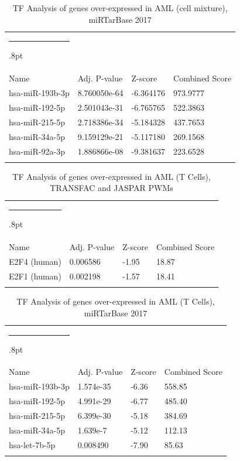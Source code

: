 \documentclass[3p,authoryear,preprint,12pt]{elsarticle}
\makeatletter
\def\hlinewd#1{%
  \noalign{\ifnum0=`}\fi\hrule \@height #1%
  \futurelet\reserved@a\@xhline}
\def\tbltoprule{\hlinewd{.8pt}\\[-12pt]}
\def\tblbottomrule{\noalign{\vspace*{6pt}}\hline\noalign{\vspace*{2pt}}}
\def\tblmidrule{\noalign{\vspace*{6pt}}\hline\noalign{\vspace*{2pt}}}
\makeatother
\begin{document}
\begin{table}[!htbp]
	\caption{{TF Analysis of genes over-expressed in AML (cell mixture), miRTarBase 2017} }
	\label{tw-de478ae31cg6}
	\def\arraystretch{1}
	\ignorespaces 
	\centering 
	\begin{tabulary}{\linewidth}{p{\dimexpr.65\tabcolsep}p{\dimexpr.15\tabcolsep}p{\dimexpr.1\tabcolsep}p{\dimexpr.1\tabcolsep}}
		\tbltoprule Name & Adj. P-value & Z-score & Combined Score\\
		\tblmidrule
hsa-miR-193b-3p & 8.760050e-64 & -6.364176 & 973.9777 \\
hsa-miR-192-5p & 2.501043e-31 & -6.765765 & 522.3863 \\
hsa-miR-215-5p & 2.718386e-34 & -5.184328 & 437.7653 \\
hsa-miR-34a-5p & 9.159129e-21 & -5.117180 & 269.1568 \\
hsa-miR-92a-3p & 1.886866e-08 & -9.381637 & 223.6528 \\
		\tblbottomrule
	\end{tabulary}\par 
\end{table}
\begin{table}[!htbp]
	\caption{{TF Analysis of genes over-expressed in AML (T Cells), TRANSFAC and JASPAR PWMs} }
	\label{tw-de478ae31ch6}
	\def\arraystretch{1}
	\ignorespaces 
	\centering 
	\begin{tabulary}{\linewidth}{p{\dimexpr.65\tabcolsep}p{\dimexpr.15\tabcolsep}p{\dimexpr.1\tabcolsep}p{\dimexpr.1\tabcolsep}}
		\tbltoprule Name & Adj. P-value & Z-score & Combined Score\\
		\tblmidrule
E2F4 (human) & 0.006586 & -1.95 & 18.87 \\
E2F1 (human) & 0.002198 & -1.57 & 18.41 \\
		\tblbottomrule
	\end{tabulary}\par 
\end{table}
\begin{table}[!htbp]
	\caption{{TF Analysis of genes over-expressed in AML (T Cells), miRTarBase 2017} }
	\label{tw-de478ae31ci6}
	\def\arraystretch{1}
	\ignorespaces 
	\centering 
	\begin{tabulary}{\linewidth}{p{\dimexpr.65\tabcolsep}p{\dimexpr.15\tabcolsep}p{\dimexpr.1\tabcolsep}p{\dimexpr.1\tabcolsep}}
		\tbltoprule Name & Adj. P-value & Z-score & Combined Score\\
		\tblmidrule
hsa-miR-193b-3p & 1.574e-35 & -6.36 & 558.85 \\
hsa-miR-192-5p & 4.991e-29 & -6.77 & 485.40 \\
hsa-miR-215-5p & 6.399e-30 & -5.18 & 384.69 \\
hsa-miR-34a-5p & 1.639e-7 & -5.12 & 112.13 \\
hsa-let-7b-5p & 0.008490 & -7.90 & 85.63 \\
		\tblbottomrule
	\end{tabulary}\par 
\end{table}
\end{document}
